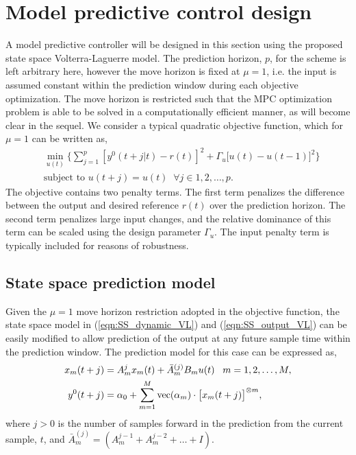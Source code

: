 \section{Model predictive control design}

A model predictive controller will be designed in this section using the proposed state space Volterra-Laguerre model. The prediction horizon, $p$, for the scheme is left arbitrary here, however the move horizon is fixed at $\mu = 1$, i.e. the input is assumed constant within the prediction window during each objective optimization. The move horizon is restricted such that the MPC optimization problem is able to be solved in a computationally efficient manner, as will become clear in the sequel. We consider a typical quadratic objective function, which for $\mu =1$ can be written as,
\begin{align}
\label{eqn:MPC_ObjFn_Chap10}
&\min_{u(t)} \Bigg\{ \sum_{j=1}^{p} [y^0(t+j|t) - r(t)]^2  + \Gamma_u \big[ u(t) - u(t-1) \big]^2 \Bigg\} \\
&\textrm{subject to } u(t+j) = u(t) \; \; \forall j \in 1,2,\hdots,p. \nonumber
\end{align}
The objective contains two penalty terms. The first term penalizes the difference between the output and desired reference $r(t)$ over the prediction horizon. The second term penalizes large input changes, and the relative dominance of this term can be scaled using the design parameter $\Gamma_u$. The input penalty term is typically included for reasons of robustness.

\subsection{State space prediction model}

Given the $\mu = 1$ move horizon restriction adopted in the objective function, the state space model in (\ref{eqn:SS_dynamic_VL}) and (\ref{eqn:SS_output_VL}) can be easily modified to allow prediction of the output at any future sample time within the prediction window. The prediction model for this case can be expressed as,
\begin{align}
x_m(t+j) &= A_m^j x_m(t) + \bar{A}_m^{(j)} B_m u(t) \; \; \; m = 1,2,\hdots,M, \label{eqn:SS_dynamicpredict_VL}\\
y^0(t+j) &= \alpha_0 + \sum_{m=1}^M \operatorname{vec}(\alpha_m) \cdot \big[ x_m(t+j) \big]^{\otimes m}  \label{eqn:SS_outputpredict_VL},
\end{align}
where $j>0$ is the number of samples forward in the prediction from the current sample, $t$, and $\bar{A}_m^{(j)} = (A_m^{j-1} + A_m^{j-2} + \hdots + I)$.

